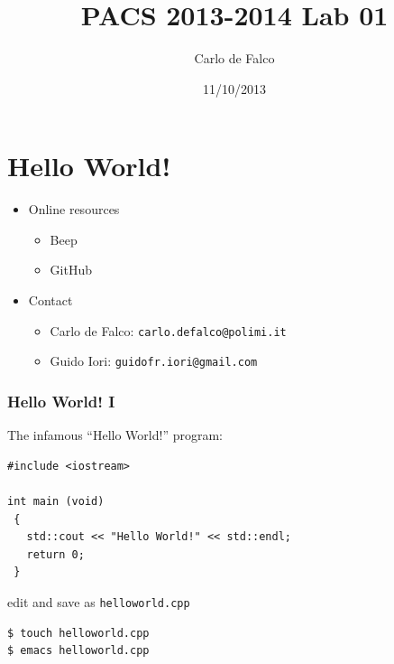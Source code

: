 \documentclass[10pt,c,ignorenonframetext]{beamer}
\author[C. de Falco]{Carlo de Falco}
\institute[]{}
\title{PACS 2013-2014 Lab 01}
\date{11/10/2013}
\begin{document}
\begin{frame}
  \titlepage
\end{frame}

\section{Hello World!}

\begin{frame}
\begin{itemize}
\item Online resources
\begin{itemize}
\item Beep
\item GitHub
\end{itemize}
\item Contact
\begin{itemize}
\item Carlo de Falco: {\tt carlo.defalco@polimi.it}
\item Guido Iori: {\tt guidofr.iori@gmail.com}
\end{itemize}
\end{itemize}

\end{frame}

\begin{frame}[fragile]
\frametitle{Hello World! I}

The infamous ``Hello World!'' program:

\begin{lstlisting}
#include <iostream>

int main (void)
 {
   std::cout << "Hello World!" << std::endl;
   return 0;
 }
\end{lstlisting}

edit and save as {\tt helloworld.cpp}

\begin{lstlisting}[language=bash]
$ touch helloworld.cpp
$ emacs helloworld.cpp
\end{lstlisting}

\end{frame}
\end{document}
